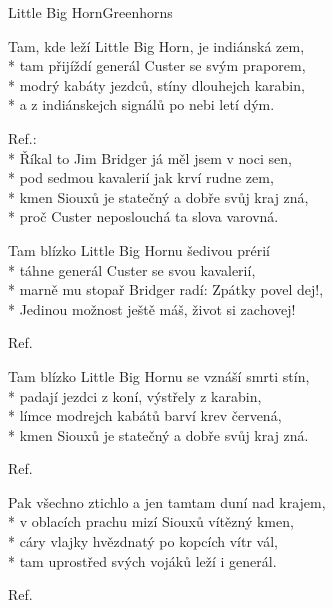 \documentclass[10.5pt]{book}
\begin{document}
\begin{poem}{Little Big Horn}{Greenhorns}

\settowidth{\versewidth}{Tam, kde leží Little Big Horn, je indiánská zem,}

Tam, kde leží Little Big Horn, je indiánská zem,\\*
tam přijíždí generál Custer se svým praporem,\\*
modrý kabáty jezdců, stíny dlouhejch karabin,\\*
a z indiánskejch signálů po nebi letí dým.

Ref.:\\*
Říkal to Jim Bridger já měl jsem v noci sen,\\*
pod sedmou kavalerií jak krví rudne zem,\\*
kmen Siouxů je statečný a dobře svůj kraj zná,\\*
proč Custer neposlouchá ta slova varovná.

Tam blízko Little Big Hornu šedivou prérií\\*
táhne generál Custer se svou kavalerií,\\*
marně mu stopař Bridger radí: Zpátky povel dej!,\\*
Jedinou možnost ještě máš, život si zachovej!

Ref.

Tam blízko Little Big Hornu se vznáší smrti stín,\\*
padají jezdci z koní, výstřely z karabin,\\*
límce modrejch kabátů barví krev červená,\\*
kmen Siouxů je statečný a dobře svůj kraj zná.

Ref.

Pak všechno ztichlo a jen tamtam duní nad krajem,\\*
v oblacích prachu mizí Siouxů vítězný kmen,\\*
cáry vlajky hvězdnatý po kopcích vítr vál,\\*
tam uprostřed svých vojáků leží i generál.

Ref.

\end{poem}
\end{document}
